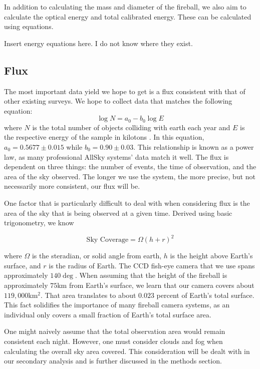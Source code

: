 In addition to calculating the mass and diameter of the fireball, we also aim to calculate the optical energy and total calibrated energy.
These can be calculated using equations.

Insert energy equations here.  I do not know where they exist.




\subsection{Flux}

The most important data yield we hope to get is a flux consistent with that of other existing surveys.
We hope to collect data that matches the following equation:
\begin{equation}
\log N = a_0 - b_0\log E 
\end{equation}
where $N$ is the total number of objects colliding with earth each year and $E$ is the respective energy of the sample in kilotons \cite{brown_p_flux_2002}.
In this equation, $a_0 = 0.5677 \pm 0.015$ while $b_0 = 0.90 \pm 0.03$.
This relationship is known as a power law, as many professional AllSky systems' data match it well.
The flux is dependent on three things: the number of events, the time of observation, and the area of the sky observed.
The longer we use the system, the more precise, but not necessarily more consistent, our flux will be. 

One factor that is particularly difficult to deal with when considering flux is the area of the sky that is being observed at a given time.
Derived using basic trigonometry, we know 

\begin{equation}
\text{Sky Coverage} = \Omega(h+r)^2
\end{equation}

where $\Omega$ is the steradian, or solid angle from earth, $h$ is the height above Earth's surface, and $r$ is the radius of Earth. 
The CCD fish-eye camera that we use spans approximately $140\deg$.
When assuming that the height of the fireball is approximately $75$km from Earth's surface, we learn that our camera covers about $119,000$km$^2$.  
That area translates to about $0.023$ percent of Earth's total surface.
This fact solidifies the importance of many fireball camera systems, as an individual only covers a small fraction of Earth's total surface area.

One might naively assume that the total observation area would remain consistent each night.
However, one must consider clouds and fog when calculating the overall sky area covered.
This consideration will be dealt with in our secondary analysis and is further discussed in the methods section.


